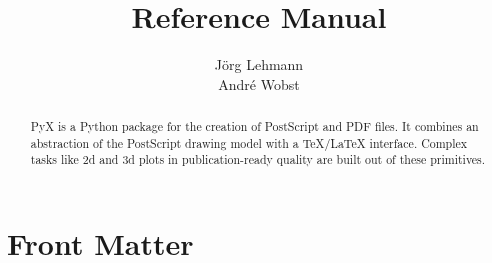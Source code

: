 \documentclass{manual}
\title{\PyX{} Reference Manual}
\author{J\"org Lehmann\\
Andr\'e Wobst}
\date{}
\def\PyX{PyX} %
\begin{document}
\maketitle
\cleardoublepage

\ifhtml %
\chapter*{Front Matter\label{front}}
\fi
\begin{abstract}
\noindent
\PyX{} is a Python package for the creation of PostScript and PDF files. It
combines an abstraction of the PostScript drawing model with a TeX/LaTeX
interface. Complex tasks like 2d and 3d plots in publication-ready quality are
built out of these primitives.
\end{abstract}

\tableofcontents


















\appendix







\end{document}
